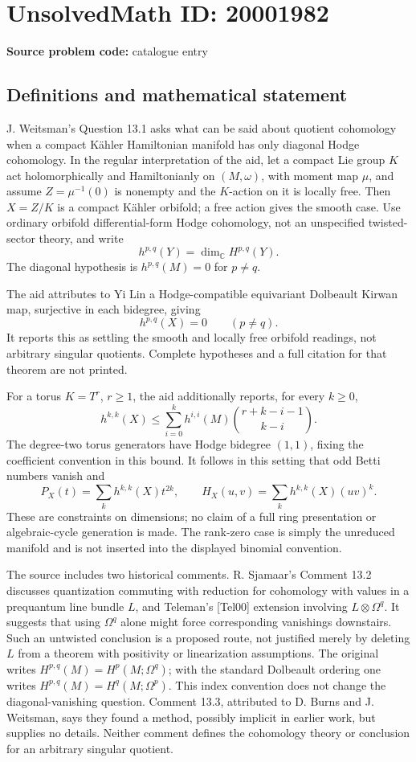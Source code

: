 \documentclass[11pt]{article}
\begin{document}
\section*{UnsolvedMath ID: 20001982}
\textbf{Source problem code:} catalogue entry
\subsection{Definitions and mathematical statement}
J. Weitsman's Question 13.1 asks what can be said about quotient cohomology when a compact K\"ahler Hamiltonian manifold has only diagonal Hodge cohomology. In the regular interpretation of the aid, let a compact Lie group \(K\) act holomorphically and Hamiltonianly on \((M,\omega)\), with moment map \(\mu\), and assume \(Z=\mu^{-1}(0)\) is nonempty and the \(K\)-action on it is locally free. Then \(X=Z/K\) is a compact K\"ahler orbifold; a free action gives the smooth case. Use ordinary orbifold differential-form Hodge cohomology, not an unspecified twisted-sector theory, and write
\[
 h^{p,q}(Y)=\dim_{\mathbb C}H^{p,q}(Y).
\]
The diagonal hypothesis is \(h^{p,q}(M)=0\) for \(p\ne q\).

The aid attributes to Yi Lin a Hodge-compatible equivariant Dolbeault Kirwan map, surjective in each bidegree, giving
\[
 h^{p,q}(X)=0\qquad(p\ne q).
\]
It reports this as settling the smooth and locally free orbifold readings, not arbitrary singular quotients. Complete hypotheses and a full citation for that theorem are not printed.

For a torus \(K=T^r\), \(r\geq1\), the aid additionally reports, for every \(k\geq0\),
\[
 h^{k,k}(X)\leq\sum_{i=0}^k h^{i,i}(M)
                  \binom{r+k-i-1}{k-i}.
\]
The degree-two torus generators have Hodge bidegree \((1,1)\), fixing the coefficient convention in this bound. It follows in this setting that odd Betti numbers vanish and
\[
 P_X(t)=\sum_kh^{k,k}(X)t^{2k},\qquad
 H_X(u,v)=\sum_kh^{k,k}(X)(uv)^k.
\]
These are constraints on dimensions; no claim of a full ring presentation or algebraic-cycle generation is made. The rank-zero case is simply the unreduced manifold and is not inserted into the displayed binomial convention.

The source includes two historical comments. R. Sjamaar's Comment 13.2 discusses quantization commuting with reduction for cohomology with values in a prequantum line bundle \(L\), and Teleman's [Tel00] extension involving \(L\otimes\Omega^q\). It suggests that using \(\Omega^q\) alone might force corresponding vanishings downstairs. Such an untwisted conclusion is a proposed route, not justified merely by deleting \(L\) from a theorem with positivity or linearization assumptions. The original writes \(H^{p,q}(M)=H^p(M;\Omega^q)\); with the standard Dolbeault ordering one writes \(H^{p,q}(M)=H^q(M;\Omega^p)\). This index convention does not change the diagonal-vanishing question. Comment 13.3, attributed to D. Burns and J. Weitsman, says they found a method, possibly implicit in earlier work, but supplies no details. Neither comment defines the cohomology theory or conclusion for an arbitrary singular quotient.
\end{document}
